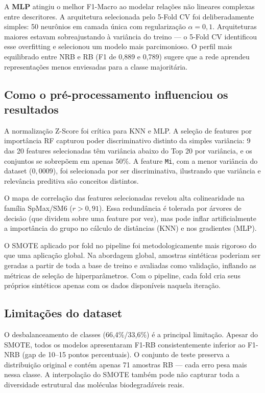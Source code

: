 \documentclass[12pt, a4paper]{article}
\begin{document}
A \textbf{MLP} atingiu o melhor F1-Macro ao modelar relações não lineares
complexas entre descritores. A arquitetura selecionada pelo 5-Fold CV foi
deliberadamente simples: 50 neurônios em camada única com regularização
$\alpha = 0{,}1$. Arquiteturas maiores estavam sobreajustando à variância do
treino --- o 5-Fold CV identificou esse overfitting e selecionou um modelo mais
parcimonioso. O perfil mais equilibrado entre NRB e RB (F1 de 0,889 e 0,789)
sugere que a rede aprendeu representações menos enviesadas para a classe
majoritária.

\subsection{Como o pré-processamento influenciou os resultados}

A normalização Z-Score foi crítica para KNN e MLP. A seleção de features por
importância RF capturou poder discriminativo distinto da simples variância:
9 das 20 features selecionadas têm variância abaixo do Top 20 por variância,
e os conjuntos se sobrepõem em apenas 50\%. A feature \texttt{Mi}, com a menor
variância do dataset ($0{,}0009$), foi selecionada por ser discriminativa,
ilustrando que variância e relevância preditiva são conceitos distintos.

O mapa de correlação das features selecionadas revelou alta colinearidade na
família SpMax/SM6 ($r > 0{,}91$). Essa redundância é tolerada por árvores de
decisão (que dividem sobre uma feature por vez), mas pode inflar artificialmente
a importância do grupo no cálculo de distâncias (KNN) e nos gradientes (MLP).

O SMOTE aplicado por fold no pipeline foi metodologicamente mais rigoroso do
que uma aplicação global. Na abordagem global, amostras sintéticas poderiam
ser geradas a partir de toda a base de treino e avaliadas como validação,
inflando as métricas de seleção de hiperparâmetros. Com o pipeline, cada fold
cria seus próprios sintéticos apenas com os dados disponíveis naquela iteração.

\subsection{Limitações do dataset}

O desbalanceamento de classes (66,4\%/33,6\%) é a principal limitação. Apesar
do SMOTE, todos os modelos apresentaram F1-RB consistentemente inferior ao
F1-NRB (gap de 10--15 pontos percentuais). O conjunto de teste preserva a
distribuição original e contém apenas 71 amostras RB --- cada erro pesa mais
nessa classe. A interpolação do SMOTE também pode não capturar toda a
diversidade estrutural das moléculas biodegradáveis reais.
\end{document}
